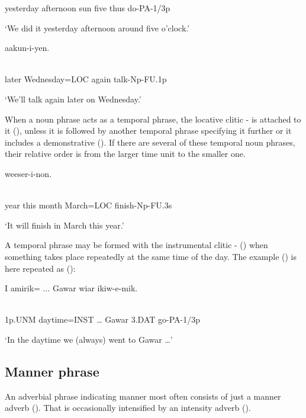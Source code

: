 yesterday  afternoon  sun  five  thus  do-PA-1/3p

`We did it yesterday afternoon around five o'clock.'

\ea%
\label{ex:x876}
\gll {} aakun-i-yen. \\
      \\
\glt
\z

later  Wednesday=LOC  again  talk-Np-FU.1p

`We'll talk again later on Wednesday.'

When a noun phrase acts as a temporal phrase, the locative clitic - is attached to it (), unless it is followed by another temporal phrase specifying it further or it includes a demonstrative (). If there are several of these temporal noun phrases, their relative order is from the larger time unit to the smaller one. 

\ea%
\label{ex:x878}
\gll {}  weeser-i-non. \\
      \\
\glt
\z

year  this  month  March=LOC  finish-Np-FU.3s

`It will finish in March this year.' 

A temporal phrase may be formed with the instrumental clitic - () when something takes place repeatedly at the same time of the day. The example () is here repeated as ():

\ea%
\label{ex:x1907}
\gll I  amirik=  ...  Gawar  wiar  ikiw-e-mik. \\
      \\
\glt
\z

1p.UNM  daytime=INST  {\dots}  Gawar  3.DAT  go-PA-1/3p

`In the daytime we (always) went to Gawar {\dots}'

\subsection{Manner phrase}
\hypertarget{RefHeading21881935131865}{}
An adverbial phrase indicating manner most often consists of just a manner adverb ().  That is occasionally intensified by an intensity adverb (). 

